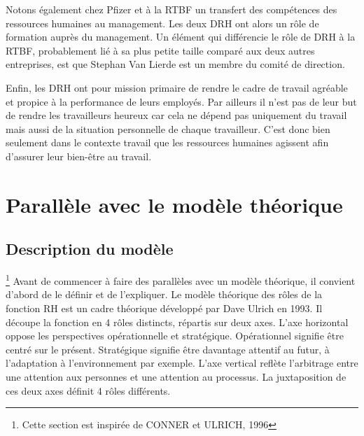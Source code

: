 \documentclass[a4paper, 12pt]{article}
\begin{document}
Notons également chez Pfizer et à la RTBF un transfert des compétences des ressources humaines au management. Les deux DRH ont alors un rôle de formation auprès du management.	
Un élément qui différencie le rôle de DRH à la RTBF, probablement lié à sa plus petite taille comparé aux deux autres entreprises, est que Stephan Van Lierde est un membre du comité de direction.

Enfin, les DRH ont pour mission primaire de rendre le cadre de travail agréable et propice à la performance de leurs employés. Par ailleurs il n'est pas de leur but de rendre les travailleurs heureux car cela ne dépend pas uniquement du travail mais aussi de la situation personnelle de chaque travailleur. C'est donc bien seulement dans le contexte travail que les ressources humaines agissent afin d'assurer leur bien-être au travail.


\section{Parallèle avec le modèle théorique}
 
 \subsection{Description du modèle} \footnote{Cette section est inspirée de CONNER et ULRICH, 1996}
Avant de commencer à faire des parallèles avec un modèle théorique, il convient d'abord de le définir et de l'expliquer. 
Le modèle théorique des rôles de la fonction RH est un cadre théorique développé par Dave Ulrich en 1993. Il découpe la fonction en 4 rôles distincts, répartis sur deux axes. L'axe horizontal oppose les perspectives opérationnelle et stratégique. Opérationnel signifie être centré sur le présent. Stratégique signifie être davantage attentif au futur, à l'adaptation à l'environnement par exemple. L'axe vertical reflète l'arbitrage entre une attention aux personnes et une attention au processus. La juxtaposition de ces deux axes définit 4 rôles différents.
\end{document}
